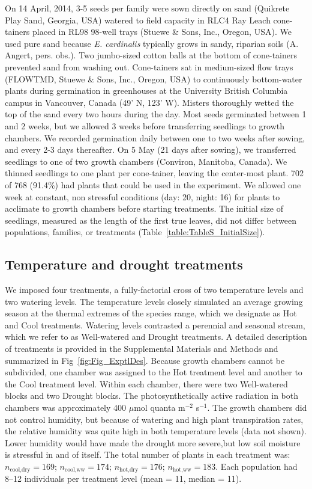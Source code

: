 \documentclass[11pt, oneside]{article}
\begin{document}
On 14 April, 2014, 3-5 seeds per family were sown directly on sand (Quikrete Play Sand, Georgia, USA) watered to field capacity in RLC4 Ray Leach cone-tainers placed in RL98 98-well trays (Stuewe \& Sons, Inc., Oregon, USA). We used pure sand because \textit{E. cardinalis} typically grows in sandy, riparian soils (A. Angert, pers. obs.). Two jumbo-sized cotton balls at the bottom of cone-tainers prevented sand from washing out. Cone-tainers sat in medium-sized flow trays (FLOWTMD, Stuewe \& Sons, Inc., Oregon, USA) to continuously bottom-water plants during germination in greenhouses at the University British Columbia campus in Vancouver, Canada (49' N, 123' W). Misters thoroughly wetted the top of the sand every two hours during the day. Most seeds germinated between 1 and 2 weeks, but we allowed 3 weeks before transferring seedlings to growth chambers. We recorded germination daily between one to two weeks after sowing, and every 2-3 days thereafter. On 5 May (21 days after sowing), we transferred seedlings to one of two growth chambers (Conviron, Manitoba, Canada). We thinned seedlings to one plant per cone-tainer, leaving the center-most plant. 702 of 768 (91.4\%) had plants that could be used in the experiment. We allowed one week at constant, non stressful conditions (day: 20\celsius, night: 16\celsius) for plants to acclimate to growth chambers before starting treatments. The initial size of seedlings, measured as the length of the first true leaves, did not differ between populations, families, or treatments (Table~\ref{table:TableS_InitialSize}).
    
\subsection*{Temperature and drought treatments}

We imposed four treatments, a fully-factorial cross of two temperature levels and two watering levels. The temperature levels closely simulated an average growing season at the thermal extremes of the species range, which we designate as Hot and Cool treatments. Watering levels contrasted a perennial and seasonal stream, which we refer to as Well-watered and Drought treatments. A detailed description of treatments is provided in the Supplemental Materials and Methods and summarized in Fig~\ref{fig:Fig_ExptlDes}. Because growth chambers cannot be subdivided, one chamber was assigned to the Hot treatment level and another to the Cool treatment level. Within each chamber, there were two Well-watered blocks and two Drought blocks. The photosynthetically active radiation in both chambers was approximately 400 $\mu$mol quanta m$^{-2}$ s$^{-1}$. The growth chambers did not control humidity, but because of watering and high plant transpiration rates, the relative humidity was quite high in both temperature levels (data not shown). Lower humidity would have made the drought more severe,but low soil moisture is stressful in and of itself. The total number of plants in each treatment was: $n_{\text{cool,dry}} = 169$; $n_{\text{cool,ww}} = 174$; $n_{\text{hot,dry}} = 176$; $n_{\text{hot,ww}} = 183$. Each population had 8--12 individuals per treatment level (mean = 11, median = 11).
\end{document}
